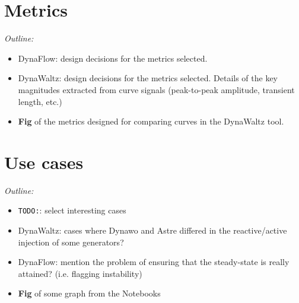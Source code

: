 \documentclass[conference]{IEEEtran}
\newcommand{\TODO}{\texttt{TODO:}}
\begin{document}
\section{Metrics}
\begin{center}
  \itshape
  Outline:
  \begin{itemize}
    \item DynaFlow: design decisions for the metrics selected.
    \item DynaWaltz: design decisions for the metrics selected. Details of
          the key magnitudes extracted from curve signals (peak-to-peak
          amplitude, transient length, etc.)
    \item \textbf{Fig} of the metrics designed for comparing curves in the
          DynaWaltz tool.
  \end{itemize}
\end{center}




\section{Use cases}

\begin{center}
  \itshape  Outline:
  \begin{itemize}
    \item \TODO: select interesting cases
    \item DynaWaltz: cases where Dynawo and Astre differed in the
          reactive/active injection of some generators?
    \item DynaFlow: mention the problem of ensuring that the steady-state
          is really attained? (i.e. flagging instability)
    \item \textbf{Fig} of some graph from the Notebooks
  \end{itemize}
\end{center}


\end{document}
